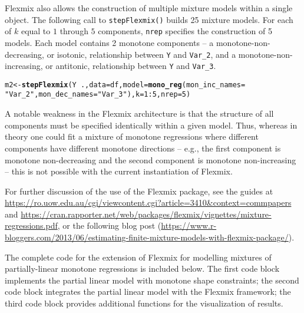\documentclass[10pt]{olplainarticle}\usepackage[]{graphicx}\usepackage[]{color}
\makeatletter
\newcommand{\hlnum}[1]{\textcolor[rgb]{0.686,0.059,0.569}{#1}}%
\newcommand{\hlstr}[1]{\textcolor[rgb]{0.192,0.494,0.8}{#1}}%
\newcommand{\hlopt}[1]{\textcolor[rgb]{0,0,0}{#1}}%
\newcommand{\hlstd}[1]{\textcolor[rgb]{0.345,0.345,0.345}{#1}}%
\newcommand{\hlkwb}[1]{\textcolor[rgb]{0.69,0.353,0.396}{#1}}%
\newcommand{\hlkwc}[1]{\textcolor[rgb]{0.333,0.667,0.333}{#1}}%
\newcommand{\hlkwd}[1]{\textcolor[rgb]{0.737,0.353,0.396}{\textbf{#1}}}%
\newenvironment{kframe}{%
 \def\at@end@of@kframe{}%
 \ifinner\ifhmode%
  \def\at@end@of@kframe{\end{minipage}}%
  \begin{minipage}{\columnwidth}%
 \fi\fi%
 \def\FrameCommand##1{\hskip\@totalleftmargin \hskip-\fboxsep
 \colorbox{shadecolor}{##1}\hskip-\fboxsep
     \hskip-\linewidth \hskip-\@totalleftmargin \hskip\columnwidth}%
 \MakeFramed {\advance\hsize-\width
   \@totalleftmargin\z@ \linewidth\hsize
   \@setminipage}}%
 {\par\unskip\endMakeFramed%
 \at@end@of@kframe}
\newenvironment{knitrout}{}{} %
\makeatother
\begin{document}
\begin{appendices}
Flexmix also allows the construction of multiple mixture models within a single object. The following call to \texttt{stepFlexmix()} builds 25 mixture models. For each of $k$ equal to $1$ through $5$ components, \texttt{nrep} specifies the construction of 5 models. Each model contains 2 monotone components -- a monotone-non-decreasing, or isotonic, relationship between \texttt{Y} and \texttt{Var\_2}, and a monotone-non-increasing, or antitonic, relationship between \texttt{Y} and \texttt{Var\_3}.

\begin{knitrout}
\color{fgcolor}\begin{kframe}
\begin{alltt}
\hlstd{m2} \hlkwb{<-} \hlkwd{stepFlexmix}\hlstd{(Y} \hlopt{~} \hlstd{.,} \hlkwc{data} \hlstd{= df,} \hlkwc{model} \hlstd{=} \hlkwd{mono_reg}\hlstd{(}\hlkwc{mon_inc_names} \hlstd{=}
                \hlstr{"Var_2"}\hlstd{,} \hlkwc{mon_dec_names} \hlstd{=} \hlstr{"Var_3"}\hlstd{),} \hlkwc{k} \hlstd{=} \hlnum{1}\hlopt{:}\hlnum{5}\hlstd{,} \hlkwc{nrep} \hlstd{=} \hlnum{5}\hlstd{)}
\end{alltt}
\end{kframe}
\end{knitrout}

A notable weakness in the Flexmix architecture is that the structure of all components must be specified identically within a given model. Thus, whereas in theory one could fit a mixture of monotone regressions where different components have different monotone directions -- e.g., the first component is monotone non-decreasing and the second component is monotone non-increasing -- this is not possible with the current instantiation of Flexmix. 

For further discussion of the use of the Flexmix package, see the guides at \url{https://ro.uow.edu.au/cgi/viewcontent.cgi?article=3410&context=commpapers} and \url{https://cran.rapporter.net/web/packages/flexmix/vignettes/mixture-regressions.pdf}, or the following blog post (\url{https://www.r-bloggers.com/2013/06/estimating-finite-mixture-models-with-flexmix-package/}).



The complete code for the extension of Flexmix for modelling mixtures of partially-linear monotone regressions is included below. The first code block implements the partial linear model with monotone shape constraints; the second code block integrates the partial linear model with the Flexmix framework; the third code block provides additional functions for the visualization of results.


\end{appendices}
\end{document}
